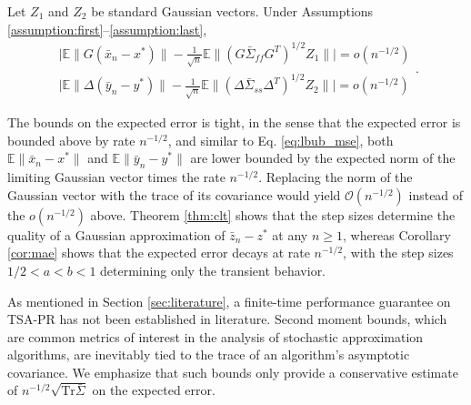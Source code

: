 \begin{corollary}\label{cor:mae}
    Let $Z_1$ and $Z_2$ be standard Gaussian vectors. 
    Under Assumptions \ref{assumption:first}--\ref{assumption:last},
    \begin{equation}\label{eq:mae}
        \begin{split}
            \Big \lvert \mathbb{E}\lVert G(\bar{x}_n - x^*) \rVert - \frac{1}{\sqrt{n}} \mathbb{E}\lVert (G \bar{\Sigma}_{ff} G^T)^{1/2} Z_1 \rVert 
            \Big \rvert = o(n^{-1/2})
            \\ 
            \Big \lvert \mathbb{E}\lVert \Delta (\bar{y}_n - y^*) \rVert - \frac{1}{\sqrt{n}} \mathbb{E}\lVert (\Delta \bar{\Sigma}_{ss} \Delta^T)^{1/2} Z_2 \rVert \Big \rvert = o(n^{-1/2})    
        \end{split}
        .
    \end{equation}    
\end{corollary}
The bounds on the expected error is tight, in the sense that the expected error is bounded above by rate $n^{-1/2}$, and similar to Eq. \eqref{eq:lbub_mse}, both $\mathbb{E}\lVert \bar{x}_n - x^*\rVert$ and $\mathbb{E}\lVert \bar{y}_n - y^* \rVert$ are lower bounded by the expected norm of the limiting Gaussian vector times the rate $n^{-1/2}$.
Replacing the norm of the Gaussian vector with the trace of its covariance would yield $\mathcal{O}(n^{-1/2})$ instead of the $o(n^{-1/2})$ above. 
Theorem \ref{thm:clt} shows that the step sizes determine the quality of a Gaussian approximation of $\bar{z}_n - z^*$ at any $n \geq 1$, whereas Corollary \ref{cor:mae} shows that the expected error decays at rate $n^{-1/2}$, with the step sizes $1/2 < a < b < 1$ determining only the transient behavior. 

\begin{remark}\label{rem:comparison_with_mse}
    As mentioned in Section \ref{sec:literature}, a finite-time performance guarantee on TSA-PR has not been established in literature.
    Second moment bounds, which are common metrics of interest in the analysis of stochastic approximation algorithms, are inevitably tied to the trace of an algorithm's asymptotic covariance. 
    We emphasize that such bounds only provide a conservative estimate of $n^{-1/2} \sqrt{\mathrm{Tr} \bar{\Sigma}}$ on the expected error.
\end{remark}

